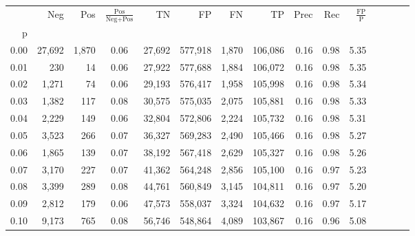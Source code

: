\begin{tabular}{rrrcrrrrrrrrrrr}
\toprule
{} &     Neg &    Pos & $\frac{\text{Pos}}{\text{Neg}+\text{Pos}}$ &       TN &       FP &       FN &       TP &  Prec &   Rec & $\frac{\text{FP}}{\text{P}}$ \\
p    &         &        &                                            &          &          &          &          &       &       &                              \\
\midrule
0.00 &  27,692 &  1,870 &                                       0.06 &   27,692 &  577,918 &    1,870 &  106,086 &  0.16 &  0.98 &                         5.35 \\
0.01 &     230 &     14 &                                       0.06 &   27,922 &  577,688 &    1,884 &  106,072 &  0.16 &  0.98 &                         5.35 \\
0.02 &   1,271 &     74 &                                       0.06 &   29,193 &  576,417 &    1,958 &  105,998 &  0.16 &  0.98 &                         5.34 \\
0.03 &   1,382 &    117 &                                       0.08 &   30,575 &  575,035 &    2,075 &  105,881 &  0.16 &  0.98 &                         5.33 \\
0.04 &   2,229 &    149 &                                       0.06 &   32,804 &  572,806 &    2,224 &  105,732 &  0.16 &  0.98 &                         5.31 \\
0.05 &   3,523 &    266 &                                       0.07 &   36,327 &  569,283 &    2,490 &  105,466 &  0.16 &  0.98 &                         5.27 \\
0.06 &   1,865 &    139 &                                       0.07 &   38,192 &  567,418 &    2,629 &  105,327 &  0.16 &  0.98 &                         5.26 \\
0.07 &   3,170 &    227 &                                       0.07 &   41,362 &  564,248 &    2,856 &  105,100 &  0.16 &  0.97 &                         5.23 \\
0.08 &   3,399 &    289 &                                       0.08 &   44,761 &  560,849 &    3,145 &  104,811 &  0.16 &  0.97 &                         5.20 \\
0.09 &   2,812 &    179 &                                       0.06 &   47,573 &  558,037 &    3,324 &  104,632 &  0.16 &  0.97 &                         5.17 \\
0.10 &   9,173 &    765 &                                       0.08 &   56,746 &  548,864 &    4,089 &  103,867 &  0.16 &  0.96 &                         5.08 \\

\end{tabular}
